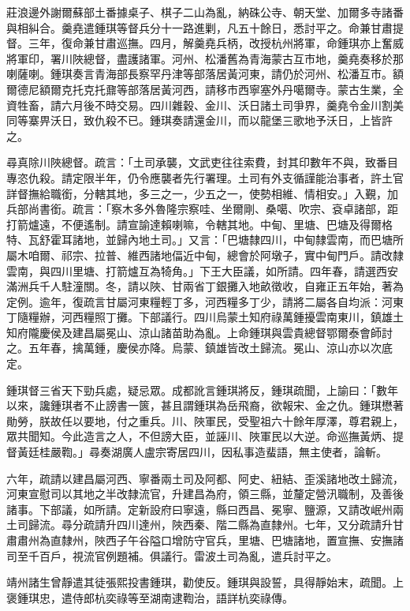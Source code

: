 \begin{pinyinscope}
莊浪邊外謝爾蘇部土番據桌子、棋子二山為亂，納硃公寺、朝天堂、加爾多寺諸番與相糾合。羹堯遣鍾琪等督兵分十一路進剿，凡五十餘日，悉討平之。命兼甘肅提督。三年，復命兼甘肅巡撫。四月，解羹堯兵柄，改授杭州將軍，命鍾琪亦上奮威將軍印，署川陜總督，盡護諸軍。河州、松潘舊為青海蒙古互市地，羹堯奏移於那喇薩喇。鍾琪奏言青海部長察罕丹津等部落居黃河東，請仍於河州、松潘互市。額爾德尼額爾克托克托鼐等部落居黃河西，請移市西寧塞外丹噶爾寺。蒙古生業，全資牲畜，請六月後不時交易。四川雜穀、金川、沃日諸土司爭界，羹堯令金川割美同等寨畀沃日，致仇殺不已。鍾琪奏請還金川，而以龍堡三歌地予沃日，上皆許之。

尋真除川陜總督。疏言：「土司承襲，文武吏往往索費，封其印數年不與，致番目專恣仇殺。請定限半年，仍令應襲者先行署理。土司有外支循謹能治事者，許土官詳督撫給職銜，分轄其地，多三之一，少五之一，使勢相維、情相安。」入覲，加兵部尚書銜。疏言：「察木多外魯隆宗察哇、坐爾剛、桑噶、吹宗、袞卓諸部，距打箭爐遠，不便遙制。請宣諭達賴喇嘛，令轄其地。中甸、里塘、巴塘及得爾格特、瓦舒霍耳諸地，並歸內地土司。」又言：「巴塘隸四川，中甸隸雲南，而巴塘所屬木咱爾、祁宗、拉普、維西諸地偪近中甸，總會於阿墩子，實中甸門戶。請改隸雲南，與四川里塘、打箭爐互為犄角。」下王大臣議，如所請。四年春，請選西安滿洲兵千人駐潼關。冬，請以陜、甘兩省丁銀攤入地畝徵收，自雍正五年始，著為定例。逾年，復疏言甘屬河東糧輕丁多，河西糧多丁少，請將二屬各自均派：河東丁隨糧辦，河西糧照丁攤。下部議行。四川烏蒙土知府祿萬鍾擾雲南東川，鎮雄土知府隴慶侯及建昌屬冕山、涼山諸苗助為亂。上命鍾琪與雲貴總督鄂爾泰會師討之。五年春，擒萬鍾，慶侯亦降。烏蒙、鎮雄皆改土歸流。冕山、涼山亦以次底定。

鍾琪督三省天下勁兵處，疑忌眾。成都訛言鍾琪將反，鍾琪疏聞，上諭曰：「數年以來，讒鍾琪者不止謗書一篋，甚且謂鍾琪為岳飛裔，欲報宋、金之仇。鍾琪懋著勛勞，朕故任以要地，付之重兵。川、陜軍民，受聖祖六十餘年厚澤，尊君親上，眾共聞知。今此造言之人，不但謗大臣，並誣川、陜軍民以大逆。命巡撫黃炳、提督黃廷桂嚴鞫。」尋奏湖廣人盧宗寄居四川，因私事造蜚語，無主使者，論斬。

六年，疏請以建昌屬河西、寧番兩土司及阿都、阿史、紐結、歪溪諸地改土歸流，河東宣慰司以其地之半改隸流官，升建昌為府，領三縣，並釐定營汛職制，及善後諸事。下部議，如所請。定新設府曰寧遠，縣曰西昌、冕寧、鹽源，又請改岷州兩土司歸流。尋分疏請升四川達州，陜西秦、階二縣為直隸州。七年，又分疏請升甘肅肅州為直隸州，陜西子午谷隘口增防守官兵，里塘、巴塘諸地，置宣撫、安撫諸司至千百戶，視流官例題補。俱議行。雷波土司為亂，遣兵討平之。

靖州諸生曾靜遣其徒張熙投書鍾琪，勸使反。鍾琪與設誓，具得靜始末，疏聞。上褒鍾琪忠，遣侍郎杭奕祿等至湖南逮鞫治，語詳杭奕祿傳。


\end{pinyinscope}
